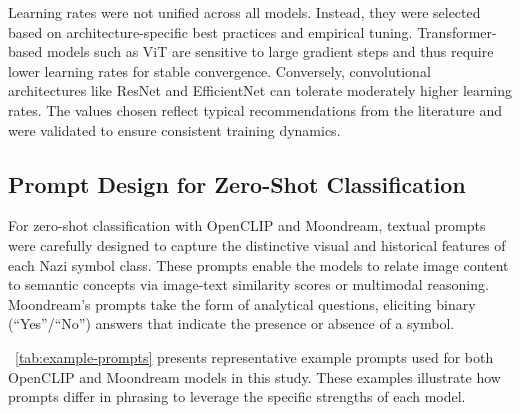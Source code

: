 Learning rates were not unified across all models. Instead, they were selected based on architecture-specific best
practices and empirical tuning. Transformer-based models such as \ac{ViT} are sensitive to large gradient steps and
thus require lower learning rates for stable convergence. Conversely, convolutional architectures like \ac{ResNet} and
EfficientNet can tolerate moderately higher learning rates. The values chosen reflect typical recommendations from
the literature and were validated to ensure consistent training dynamics.



\subsection{Prompt Design for Zero-Shot Classification}

For zero-shot classification with OpenCLIP and Moondream, textual prompts were carefully designed to capture the
distinctive visual and historical features of each Nazi symbol class. These prompts enable the models to relate
image content to semantic concepts via image-text similarity scores or multimodal reasoning. Moondream’s prompts
take the form of analytical questions, eliciting binary (“Yes”/“No”) answers that indicate the presence or absence
of a symbol.

~\autoref{tab:example-prompts} presents representative example prompts used for both OpenCLIP and Moondream models
in this study. These examples illustrate how prompts differ in phrasing to leverage the specific strengths of each model.


\begin{table}[ht]
\centering
{}
\caption{Example prompts used for zero-shot classification with OpenCLIP and Moondream.}
\label{tab:example-prompts}
\end{table}


